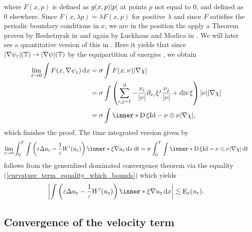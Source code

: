 where $ F ( x, p ) $ is defined as $ g ( x , p ) \abs{ p } $ at points $ p $ not equal to 0, and defined as 0 elsewhere. Since $ F (x , \lambda p ) = \lambda F ( x, p ) $ for positive $ \lambda $ and since $ F $ satisfies the periodic boundary conditions in $ x $, we are in the position the apply a Theorem proven by Reshetnyak in \cite{Reshetnyak_weak_convergence} and again by Luckhaus and Modica in \cite[]{luckhaus_modica_gibbs_thompson_relation}. We will later see a quantitative version of this in . Here it yields that since $ \abs{ \nabla \psi_{ \varepsilon  } } ( \operatorname{\mathbb{T}} ) \to \abs{ \nabla \psi } ( \operatorname{\mathbb{T}} ) $ by the equipartition of energies , we obtain
\begin{align*}
	\lim_{ \varepsilon \to 0 }
		\int
			F ( x, \nabla \psi_{ \varepsilon } )
		\dd{ x }
	& =
	\sigma
	\int
		F ( x , \nu )
	\abs{ \nabla \chi }
	\\
	& = 
	\sigma
	\int
		\left(
			\sum_{ i, j = 1}^{ d }
				-
				\frac{ \nu_{ i } }{ \abs{ \nu } }
				\partial_{ x_{ i } } \xi^{ j }
				\frac{ \nu_{ j } }{ \abs{ \nu } }
			+
			\divg \xi 
		\right)
		\abs{ \nu }
	\abs{ \nabla \chi }
	\\
	& =
	\sigma
	\int
		\inner*{ \diff \xi }{ \mathrm{Id} - \nu \otimes \nu }
	\abs{ \nabla \chi },
\end{align*}
which finishes the proof.
The time integrated version given by
\begin{equation*}
	\lim_{ \varepsilon \to 0 }
	\int_{ 0 }^{ T }
	\int
	\left(
	\varepsilon \Delta u_{ \varepsilon }
	- 
	\frac{ 1 }{ \varepsilon }
	W'( u_{ \varepsilon } )
	\right)
	\inner*{ \xi }{ \nabla u_{ \varepsilon } }
	\dd{ x }
	\dd{ t }
	=
	\sigma
	\int_{ 0 }^{ T }
	\int
	\inner*{ \diff \xi }{ \mathrm{Id} - \nu \otimes \nu }
	\abs{ \nabla \chi }
	\dd{ t }
\end{equation*} 
follows from the generalized dominated convergence theorem via the equality (\ref{curvature_term_equality_which_bounds}) which yields
\begin{equation*}
	\abs{
		\int
			\left(
				\varepsilon \Delta u_{ \varepsilon } 
				-
				\frac{ 1 }{ \varepsilon }
				W'( u_{ \varepsilon } )
			\right)
			\inner*{ \xi } { \nabla u_{ \varepsilon } }
		\dd{ x }
	}
	\lesssim
	\energy_{ \varepsilon } ( u_{ \varepsilon } ).
\end{equation*}


\subsection{Convergence of the velocity term}

